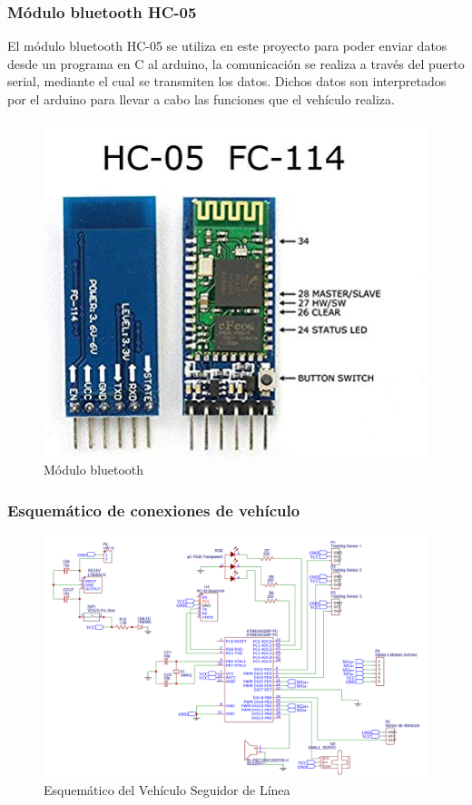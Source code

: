 \subsubsection{Módulo bluetooth HC-05}
El módulo bluetooth HC-05 se utiliza en este proyecto para poder enviar datos desde un programa en C al arduino, la comunicación se realiza a través del puerto serial, mediante el cual se transmiten los datos. Dichos datos son interpretados por el arduino para llevar a cabo las funciones que el vehículo realiza. 
\begin{figure}[H]
    \centering
    \includegraphics[width= 7 cm]{./imagenes/hc-05.jpg}
    \caption{Módulo bluetooth \cite{bluetooth}}
   
\end{figure}


\subsubsection{Esquemático de conexiones de vehículo}

\begin{figure}[H]
    \centering
    \includegraphics[width = 18 cm]{imagenes/schem_vehiculo.PNG}
    \caption{Esquemático del Vehículo Seguidor de Línea}
\end{figure}



